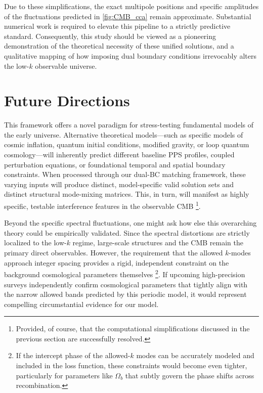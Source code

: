 Due to these simplifications, the exact multipole positions and specific amplitudes of the fluctuations predicted in \cref{fig:CMB_cca} remain approximate. Substantial numerical work is required to elevate this pipeline to a strictly predictive standard. Consequently, this study should be viewed as a pioneering demonstration of the theoretical necessity of these unified solutions, and a qualitative mapping of how imposing dual boundary conditions irrevocably alters the low-$k$ observable universe.


\section{Future Directions}\label{sec:future_work}

This framework offers a novel paradigm for stress-testing fundamental models of the early universe. Alternative theoretical models—such as specific models of cosmic inflation, quantum initial conditions, modified gravity, or loop quantum cosmology—will inherently predict different baseline PPS profiles, coupled perturbation equations, or foundational temporal and spatial boundary constraints. When processed through our dual-BC matching framework, these varying inputs will produce distinct, model-specific valid solution sets and distinct structural mode-mixing matrices. This, in turn, will manifest as highly specific, testable interference features in the observable CMB \footnote{Provided, of course, that the computational simplifications discussed in the previous section are successfully resolved.}.

Beyond the specific spectral fluctuations, one might ask how else this overarching theory could be empirically validated. Since the spectral distortions are strictly localized to the low-$k$ regime, large-scale structures and the CMB remain the primary direct observables. However, the requirement that the allowed $k$-modes approach integer spacing provides a rigid, independent constraint on the background cosmological parameters themselves \cite{pjz6-47jv} \footnote{If the intercept phase of the allowed-$k$ modes can be accurately modeled and included in the loss function, these constraints would become even tighter, particularly for parameters like $\Omega_b$ that subtly govern the phase shifts across recombination.}. If upcoming high-precision surveys independently confirm cosmological parameters that tightly align with the narrow allowed bands predicted by this periodic model, it would represent compelling circumstantial evidence for our model.

